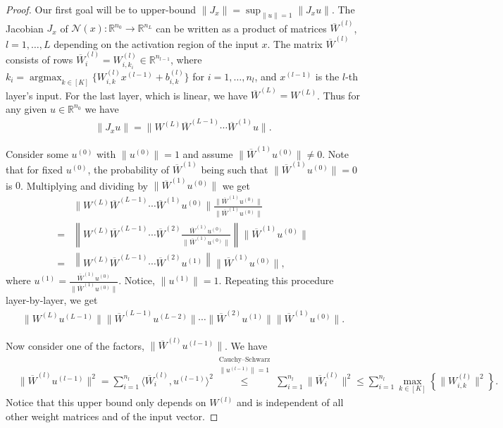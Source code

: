 \documentclass{article}
\theoremstyle{definition}
\DeclareMathOperator*{\argmax}{argmax}
\begin{document}
\begin{proof}

Our first goal will be to upper-bound $\|J_x\| = \sup_{\|u\| = 1} \| J_x u \|$. 
The Jacobian $J_x$ of $\mathcal{N}(x)\colon \mathbb{R}^{n_0} \rightarrow \mathbb{R}^{n_L}$ 
can be written as a product of matrices $\overline{W}^{(l)}$, $l=1,\ldots,L$ depending on the activation region of the input $x$. 
The matrix $\overline{W}^{(l)}$ consists of rows $\overline{W}_i^{(l)} = W_{i, k_i}^{(l)}\in\mathbb{R}^{n_{l-1}}$, where $k_i = \argmax_{k\in[K]}\{W^{(l)}_{i,k}x^{(l - 1)} + b^{(l)}_{i,k}\}$ for $i = 1, \ldots, n_l$,  
and $x^{(l-1)}$ is the $l$-th layer's input. 
For the last layer, which is linear, we have $\overline W^{(L)} = W^{(L)}$. 
Thus for any given $u\in\mathbb{R}^{n_0}$ we have 
\begin{align*}
    \| J_x u \| = \|W^{(L)} \overline{W}^{(L - 1)} \cdots \overline{W}^{(1)} u\|.
\end{align*}

Consider some $u^{(0)}$ with $\|u^{(0)}\|=1$ and assume $\|\overline{W}^{(1)} u^{(0)}\|\neq 0$. 
Note that for fixed $u^{(0)}$, the probability of $\overline{W}^{(1)}$ being such that $\|\overline{W}^{(1)} u^{(0)}\| = 0$ is $0$. 
%
Multiplying and dividing by $\| \overline{W}^{(1)} u^{(0)}\|$ we get
\begin{align*}
    &\|W^{(L)} \overline{W}^{(L - 1)} \cdots \overline{W}^{(1)} u^{(0)}\| \frac{\| \overline{W}^{(1)} u^{(0)}\|}{\| \overline{W}^{(1)} u^{(0)}\|}\\
    = &\left\|W^{(L)} \overline{W}^{(L - 1)} \cdots \overline{W}^{(2)} \frac{ \overline{W}^{(1)} u^{(0)}}{\| \overline{W}^{(1)} u^{(0)}\|}\right\| \| \overline{W}^{(1)} u^{(0)}\|\\
    = &\left\|W^{(L)} \overline{W}^{(L - 1)} \cdots \overline{W}^{(2)} u^{(1)}\right\| \| \overline{W}^{(1)} u^{(0)}\|,
\end{align*}
where $u^{(1)} = \frac{ \overline{W}^{(1)} u^{(0)}}{\| \overline{W}^{(1)} u^{(0)}\|}$. Notice, $\|u^{(1)}\| = 1$.
%
Repeating this procedure layer-by-layer, we get 
\begin{align*}
    \|W^{(L)} u^{(L-1)}\| \| \overline{W}^{(L-1)} u^{(L-2)}\| \cdots \| \overline{W}^{(2)} u^{(1)}\| \| \overline{W}^{(1)} u^{(0)}\| . 
\end{align*} 

Now consider one of the factors, $\| \overline{W}^{(l)} u^{(l-1)}\|$. 
We have 
\begin{align*}
    &\| \overline{W}^{(l)} u^{(l-1)}\|^2 = \sum_{i=1}^{n_l} \langle \overline{W}_i^{(l)}, u^{(l-1)} \rangle^2 
    \stackrel{\substack{\text{Cauchy–Schwarz}\\ \|u^{(l-1)}\| = 1}}{\leq}
    \sum_{i=1}^{n_l} \|\overline{W}_{i}^{(l)}\|^2
    \leq \sum_{i=1}^{n_l} \max_{k \in [K]} \left\{ \|W_{i,k}^{(l)}\|^2 \right\}.
\end{align*}
Notice that this upper bound only depends on $W^{(l)}$ and is independent of all other weight matrices and of the input vector. 


\end{proof}
\end{document}
